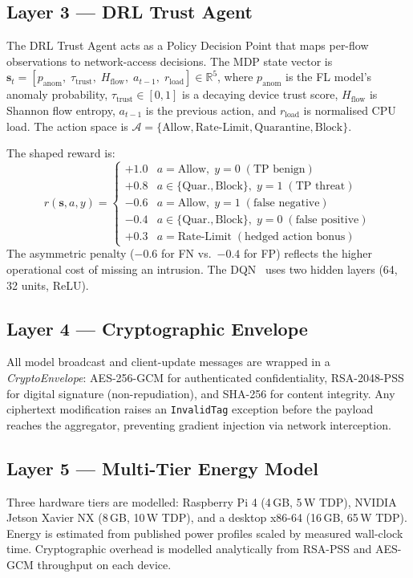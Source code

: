 \documentclass[sn-mathphys,Numbered]{sn-jnl}
\begin{document}
\subsection{Layer 3 --- DRL Trust Agent}\label{sec:layer3}
The DRL Trust Agent acts as a Policy Decision Point that maps per-flow observations to network-access decisions. The MDP state vector is $\mathbf{s}_t = [p_\text{anom},\;\tau_\text{trust},\;H_\text{flow},\; a_{t-1},\;r_\text{load}] \in \mathbb{R}^5$, where $p_\text{anom}$ is the FL model's anomaly probability, $\tau_\text{trust}\in[0,1]$ is a decaying device trust score, $H_\text{flow}$ is Shannon flow entropy, $a_{t-1}$ is the previous action, and $r_\text{load}$ is normalised CPU load. The action space is $\mathcal{A}=\{\text{Allow},\text{Rate-Limit},\text{Quarantine},\text{Block}\}$.

The shaped reward is:
\begin{equation}
r(\mathbf{s},a,y) =
\begin{cases}
+1.0 & a{=}\text{Allow},\;y{=}0\;(\text{TP benign})\\
+0.8 & a{\in}\{\text{Quar.},\text{Block}\},\;y{=}1\;(\text{TP threat})\\
-0.6 & a{=}\text{Allow},\;y{=}1\;(\text{false negative})\\
-0.4 & a{\in}\{\text{Quar.},\text{Block}\},\;y{=}0\;(\text{false positive})\\
+0.3 & a{=}\text{Rate-Limit}\;(\text{hedged action bonus})
\end{cases}
\label{eq:reward}
\end{equation}
The asymmetric penalty ($-0.6$ for FN vs.\ $-0.4$ for FP) reflects the higher operational cost of missing an intrusion. The DQN~\cite{mnih2015} uses two hidden layers (64, 32 units, ReLU).

\subsection{Layer 4 --- Cryptographic Envelope}\label{sec:layer4}
All model broadcast and client-update messages are wrapped in a \textit{CryptoEnvelope}: AES-256-GCM for authenticated confidentiality, RSA-2048-PSS for digital signature (non-repudiation), and SHA-256 for content integrity. Any ciphertext modification raises an \texttt{InvalidTag} exception before the payload reaches the aggregator, preventing gradient injection via network interception.

\subsection{Layer 5 --- Multi-Tier Energy Model}\label{sec:layer5}
Three hardware tiers are modelled: Raspberry Pi 4 (4\,GB, 5\,W TDP), NVIDIA Jetson Xavier NX (8\,GB, 10\,W TDP), and a desktop x86-64 (16\,GB, 65\,W TDP). Energy is estimated from published power profiles scaled by measured wall-clock time. Cryptographic overhead is modelled analytically from RSA-PSS and AES-GCM throughput on each device.
\end{document}
